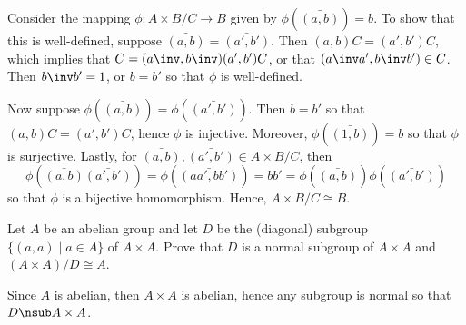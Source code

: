 \begin{problems}
\begin{sol}
        Consider the mapping $\phi : A \times B/C \to B$ given by $\phi(\bar{(a, b)}) = b$. To show that this is well-defined, suppose $\bar{(a, b)} = \bar{(a', b')}$. Then $(a, b)C = (a', b')C$, which implies that $C = (a\inv, b\inv)(a', b')C$, or that $(a\inv a', b\inv b') \in C$. Then $b\inv b' = 1$, or $b = b'$ so that $\phi$ is well-defined.

        Now suppose $\phi(\bar{(a, b)}) = \phi(\bar{(a', b')})$. Then $b = b'$ so that $(a, b)C = (a', b')C$, hence $\phi$ is injective. Moreover, $\phi(\bar{(1, b)}) = b$ so that $\phi$ is surjective. Lastly, for $\bar{(a, b)}, \bar{(a', b')} \in A \times B/C$, then 
        \[\phi(\bar{(a, b)}\bar{(a', b')}) = \phi(\bar{(aa', bb')}) = bb' = \phi(\bar{(a, b)})\phi(\bar{(a', b')})\]
        so that $\phi$ is a bijective homomorphism. Hence, $A \times B/C \cong B$.
    \end{sol}
    \item Let $A$ be an abelian group and let $D$ be the (diagonal) subgroup $\{(a,a) \mid a \in A\}$ of $A \times A$. Prove that $D$ is a normal subgroup of $A \times A$ and $(A \times A)/D \cong A$.
    \begin{sol}
        Since $A$ is abelian, then $A \times A$ is abelian, hence any subgroup is normal so that $D \nsub A \times A$.


\end{sol}
\end{problems}
